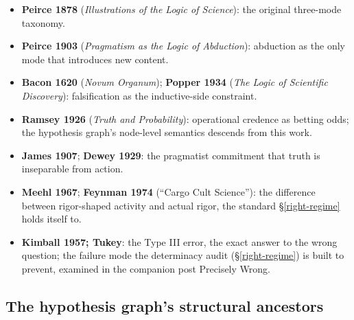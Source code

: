 \documentclass[
  10pt,
]{article}
\providecommand{\tightlist}{%
  \setlength{\itemsep}{0pt}\setlength{\parskip}{0pt}}
\begin{document}
\begin{itemize}
\tightlist
\item
  \textbf{Peirce 1878} (\emph{Illustrations of the Logic of Science}):
  the original three-mode taxonomy.
\item
  \textbf{Peirce 1903} (\emph{Pragmatism as the Logic of Abduction}):
  abduction as the only mode that introduces new content.
\item
  \textbf{Bacon 1620} (\emph{Novum Organum}); \textbf{Popper 1934}
  (\emph{The Logic of Scientific Discovery}): falsification as the
  inductive-side constraint.
\item
  \textbf{Ramsey 1926} (\emph{Truth and Probability}): operational
  credence as betting odds; the hypothesis graph's node-level semantics
  descends from this work.
\item
  \textbf{James 1907}; \textbf{Dewey 1929}: the pragmatist commitment
  that truth is inseparable from action.
\item
  \textbf{Meehl 1967}; \textbf{Feynman 1974} (``Cargo Cult Science''):
  the difference between rigor-shaped activity and actual rigor, the
  standard \S\ref{right-regime} holds itself to.
\item
  \textbf{Kimball 1957; Tukey}: the Type III error, the exact answer to
  the wrong question; the failure mode the determinacy audit
  (\S\ref{right-regime}) is built to prevent, examined in the companion
  post Precisely Wrong.
\end{itemize}

\subsection{The hypothesis graph's structural
ancestors}\label{the-hypothesis-graphs-structural-ancestors}
\end{document}
